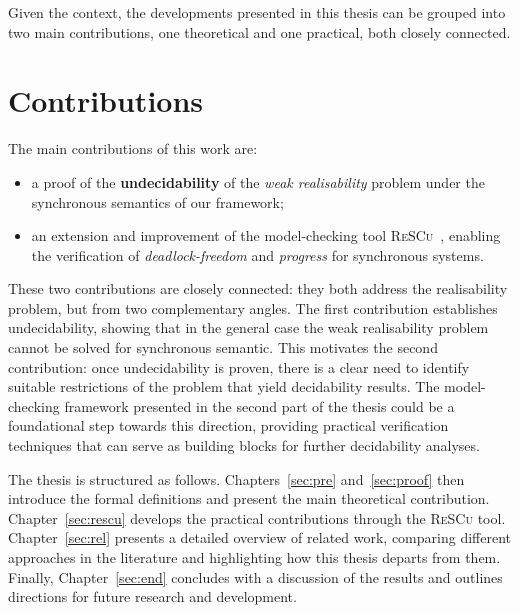 Given the context, the developments presented in this thesis can be 
grouped into two main
contributions, one theoretical and one practical, both closely
connected.

\section{Contributions}
The main contributions of this work are: 
\begin{itemize}
    \item a proof of the \textbf{undecidability} of the 
    \textit{weak realisability} problem under the synchronous 
    semantics of our framework;
    \item an extension and improvement of the model-checking tool 
    \textsc{ReSCu}~\cite{rescurepo}, enabling the verification of 
    \textit{deadlock-freedom} and \textit{progress} for synchronous 
    systems.
\end{itemize}

These two contributions are closely connected: they both address the 
realisability problem, but from two complementary angles. The first 
contribution establishes undecidability, showing that in the general 
case the weak realisability problem cannot be solved for synchronous semantic. 
This motivates the second contribution: once undecidability is proven, 
there is a clear need to identify suitable restrictions of the problem 
that yield decidability results. The model-checking framework presented 
in the second part of the thesis could be a foundational step 
towards this direction, providing practical verification techniques that 
can serve as building blocks for further decidability analyses.

The thesis is structured as follows. 
Chapters~\ref{sec:pre} and~\ref{sec:proof} 
then introduce the formal definitions and present the main theoretical 
contribution. Chapter~\ref{sec:rescu} develops the practical 
contributions through the \textsc{ReSCu} tool. 
Chapter~\ref{sec:rel} presents 
a detailed overview of related work, comparing different approaches in 
the literature and highlighting how this thesis departs from them. Finally, 
Chapter~\ref{sec:end} concludes with a discussion of the results and 
outlines directions for future research and development.
